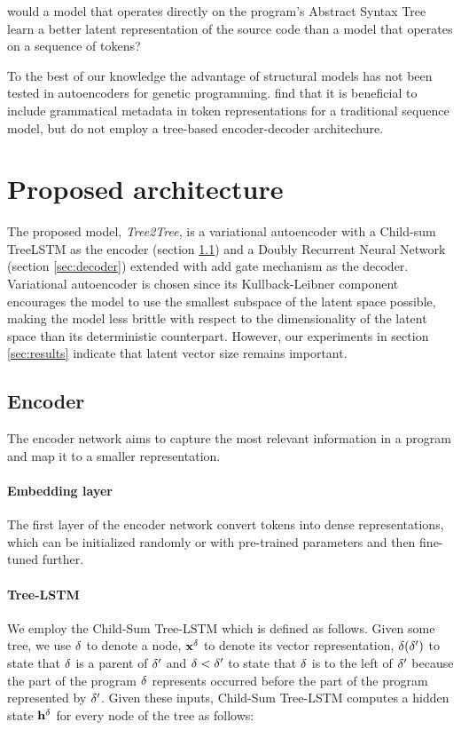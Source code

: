\begin{highlight}
    would a model that operates directly on the program's Abstract Syntax Tree learn a better latent representation of the source code than a model that operates on a sequence of tokens?
\end{highlight}

To the best of our knowledge the advantage of structural models has not been tested in autoencoders for genetic programming. 
\cite{kusner2017grammar,grammar-vae} find that it is beneficial to include grammatical metadata in token representations for a traditional sequence model, but do not employ a tree-based encoder-decoder architechure.

\newpage
\section{Proposed architecture}

The proposed model, \emph{Tree2Tree}, is a variational autoencoder with a Child-sum TreeLSTM as the encoder (section \ref{sec:encoder}) and a Doubly Recurrent Neural Network (section \ref{sec:decoder}) extended with add gate mechanism as the decoder.
Variational autoencoder \cite{kingma2013auto} is chosen since its Kullback-Leibner component encourages the model to use the smallest subspace of the latent space possible, making the model less brittle with respect to the dimensionality of the latent space than its deterministic counterpart.
However, our experiments in section \ref{sec:results} indicate that latent vector size remains important.

\subsection{Encoder}
\label{sec:encoder}
The encoder network aims to capture the most relevant information in a program and map it to a smaller representation. 

\paragraph{Embedding layer} The first layer of the encoder network convert tokens into dense representations, which can be initialized randomly or with pre-trained parameters and then fine-tuned further.


\paragraph{Tree-LSTM} We employ the Child-Sum Tree-LSTM \cite{tai2015improved} which is defined as follows. Given some tree, we use $\delta$ to denote a node, $\mathbf{x}^\delta$ to denote its vector representation, $\delta(\delta')$ to state that $\delta$ is a parent of $\delta'$ and $\delta < \delta'$ to state that $\delta$ is to the left of $\delta'$ because the part of the program $\delta$ represents occurred before the part of the program represented by $\delta'$.
Given these inputs, Child-Sum Tree-LSTM computes a hidden state $\mathbf{h}^\delta$ for every node of the tree as follows:

